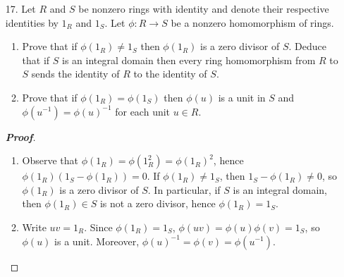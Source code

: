 \documentclass[12pt,leqno]{book}
\theoremstyle{definition}
\newcommand{\Z}{\mathbb{Z}}
\newenvironment{Proof}{\begin{proof}[\textnormal{\textbf{Proof}}]}{\end{proof}}
\begin{document}
\begin{enumerate}
\begin{Proof}
\begin{enumerate}
  \item The fact that this set is closed under subtraction is clear. Take $x=\begin{bmatrix}x_1&x_2\\\frac{(D-1)x_2}{4}&x_1+x_2\end{bmatrix}$ and $y=\begin{bmatrix}y_1&y_2\\\frac{(D-1)y_2}{4}&y_1+y_2\end{bmatrix}$ and observe that \begin{align*}xy&=\begin{bmatrix}x_1&x_2\\\frac{(D-1)x_2}{4}&x_1+x_2\end{bmatrix}\begin{bmatrix}y_1&y_2\\\frac{(D-1)y_2}{4}&y_1+y_2\end{bmatrix}\\&=\begin{bmatrix}x_1y_1+\frac{D-1}{4}x_2y_2&x_1y_2+x_2y_1+x_2y_2\\\frac{D-1}{4}x_2y_1+\frac{D-1}{4}(x_1+x_2)y_2&\frac{D-1}{4}x_2y_2+(x_1+x_2)(y_1+y_2)\end{bmatrix}\end{align*} Thus this set forms a subring. Moreover, by the isomorphism described above, this set is isomorphic to the subring $\mathcal{O}$ of $\Z[\sqrt{D}]$.
 \end{enumerate}

\end{Proof}

 \item [17.] Let $R$ and $S$ be nonzero rings with identity and denote their respective identities by $1_R$ and $1_S$. Let $\phi:R\to S$ be a nonzero homomorphism of rings.
  \begin{enumerate}
   \item Prove that if $\phi(1_R)\not=1_S$ then $\phi(1_R)$ is a zero divisor of $S$. Deduce that if $S$ is an integral domain then every ring homomorphism from $R$ to $S$ sends the identity of $R$ to the identity of $S$.
   \item Prove that if $\phi(1_R)=\phi(1_S)$ then $\phi(u)$ is a unit in $S$ and $\phi(u^{-1})=\phi(u)^{-1}$ for each unit $u\in R$.
  \end{enumerate}

\begin{Proof}\indent
 \begin{enumerate}
  \item Observe that $\phi(1_R)=\phi(1_R^2)=\phi(1_R)^2$, hence $\phi(1_R)(1_S-\phi(1_R))=0$. If $\phi(1_R)\not=1_S$, then $1_S-\phi(1_R)\not=0$, so $\phi(1_R)$ is a zero divisor of $S$. In particular, if $S$ is an integral domain, then $\phi(1_R)\in S$ is not a zero divisor, hence $\phi(1_R)=1_S$.
  \item Write $uv=1_R$. Since $\phi(1_R)=1_S$, $\phi(uv)=\phi(u)\phi(v)=1_S$, so $\phi(u)$ is a unit. Moreover, $\phi(u)^{-1}=\phi(v)=\phi(u^{-1})$.
 \end{enumerate}


\end{Proof}
\end{enumerate}
\end{document}
